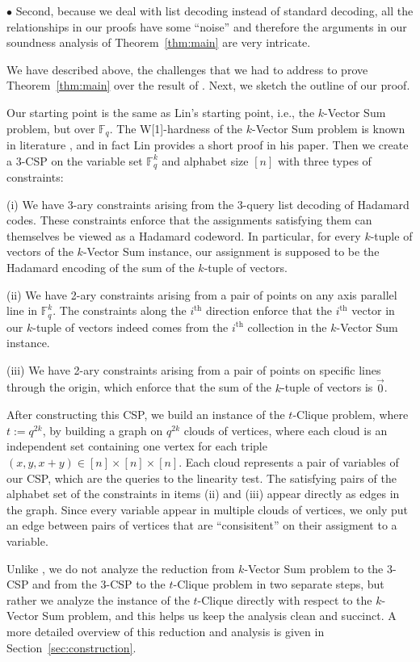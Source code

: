 \documentclass[10pt,a4paper]{article}
\newcommand{\F}{\mathbb{F}}
\begin{document}
$\bullet$ Second, because we deal with list decoding instead of standard decoding, all the relationships in our proofs have some ``noise'' and therefore the arguments in our soundness analysis of Theorem~\ref{thm:main} are very intricate. 

We have described above, the challenges that we had to address to prove Theorem~\ref{thm:main} over the result of \cite{L21}. Next, we sketch the outline of our proof.

Our starting point is the same as Lin's starting point, i.e., the $k$-Vector Sum problem, but over $\F_q$. The W[1]-hardness of the $k$-Vector Sum problem is known in literature \cite{ALW13}, and in fact Lin provides a short proof in his paper. Then we create a 3-CSP on the variable set $\F_q^k$ and alphabet size $[n]$ with three types of constraints:

(i) We have 3-ary constraints arising from the 3-query list decoding of Hadamard codes. These constraints enforce that the assignments satisfying them  can themselves be viewed as a Hadamard codeword.  In particular, for every $k$-tuple of vectors of the $k$-Vector Sum  instance, our assignment is supposed to be the Hadamard encoding of the sum of the $k$-tuple of vectors. 

(ii) We have 2-ary constraints arising from a pair of points on any  axis parallel line in $\F_q^k$. The constraints along the $i^{\text{th}}$ direction enforce  that the  $i^{\text{th}}$  vector in our $k$-tuple of vectors indeed comes from  the  $i^{\text{th}}$ collection in the $k$-Vector Sum  instance. 

(iii) We have 2-ary constraints arising from a pair of points on specific lines through the origin, which enforce that the  sum of the $k$-tuple of vectors 
is $\vec{0}$.

After constructing this CSP, we build an instance of the $t$-Clique problem, where $t:=q^{2k}$, by building a graph on $q^{2k}$ clouds of vertices, where each cloud is an independent set containing one vertex for each triple $(x,y,x+y)\in[n]\times [n]\times [n]$. Each cloud represents a pair of variables of our CSP, which are the queries to the linearity test. The satisfying pairs of the alphabet set of the constraints in items (ii) and (iii) appear directly as edges in the graph. Since every variable appear in multiple clouds of vertices, we only put an edge between pairs of vertices that are ``consisitent'' on their assigment to a variable. 

Unlike \cite{L21}, we do not analyze the reduction from $k$-Vector Sum problem to the 3-CSP and from the 3-CSP to the $t$-Clique problem in two separate steps, but rather we analyze the instance of the $t$-Clique directly with respect to the $k$-Vector Sum problem, and this helps us keep the analysis clean and succinct. 
A more detailed overview of this reduction and analysis  is given in Section~\ref{sec:construction}. 
\end{document}
